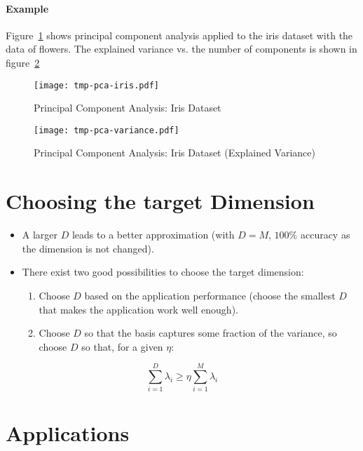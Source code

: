 \documentclass[a4paper, 11pt, accentcolor = tud3b]{tudreport}
\begin{document}
				\paragraph{Example}
					Figure~\ref{fig:pcaIris} shows principal component analysis applied to the iris dataset with the data of flowers. The explained variance vs. the number of components is shown in figure~\ref{fig:pcaIrisVariance}
					
					\begin{figure}
						\centering
						\texttt{[image: tmp-pca-iris.pdf]}
						\caption{Principal Component Analysis: Iris Dataset}
						\label{fig:pcaIris}
					\end{figure}
					\begin{figure}
						\centering
						\texttt{[image: tmp-pca-variance.pdf]}
						\caption{Principal Component Analysis: Iris Dataset (Explained Variance)}
						\label{fig:pcaIrisVariance}
					\end{figure}

		\section{Choosing the target Dimension}
			\begin{itemize}
				\item A larger \(D\) leads to a better approximation (with \( D = M \), \(100\%\) accuracy as the dimension is not changed).
				\item There exist two good possibilities to choose the target dimension:
					\begin{enumerate}
						\item Choose \(D\) based on the application performance (choose the smallest \(D\) that makes the application work well enough).
						\item Choose \(D\) so that the basis captures some fraction of the variance, so choose \( D \) so that, for a given \( \eta \):
					\end{enumerate}
			\end{itemize}
			\begin{equation}
				\sum_{i = 1}^{D} \lambda_i \geq \eta \sum_{i = 1}^{M} \lambda_i
			\end{equation}

		\section{Applications} %
		
\end{document}
